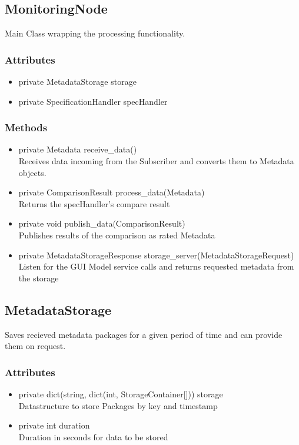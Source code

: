
\subsection{MonitoringNode}
Main Class wrapping the processing functionality.

\subsubsection{Attributes}
\begin{itemize}
	\item private MetadataStorage storage
	\item private SpecificationHandler specHandler
\end{itemize}
\subsubsection{Methods}
\begin{itemize}
	\item private Metadata receive_data()\\
	Receives data incoming from the Subscriber and converts them to Metadata objects.
	\item private ComparisonResult process_data(Metadata)\\
	Returns the specHandler's compare result
	\item private void publish_data(ComparisonResult)\\
	Publishes results of the comparison as rated Metadata
	\item private MetadataStorageResponse storage_server(MetadataStorageRequest)\\
	Listen for the GUI Model service calls and returns requested metadata from the storage
\end{itemize}


\subsection{MetadataStorage}
Saves recieved metadata packages for a given period of time and can provide them on request.

\subsubsection{Attributes}
\begin{itemize}
	\item private dict(string, dict(int, StorageContainer[])) storage\\
	Datastructure to store Packages by key and timestamp
	\item private int duration\\
	Duration in seconds for data to be stored
\end{itemize}
